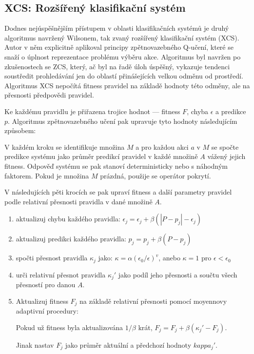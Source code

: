 \subsection{XCS: Rozšířený klasifikační systém}

Dodnes nejúspěšnějším přístupem v oblasti klasifikačních systémů je druhý algoritmus navržený Wilsonem, tak zvaný rozšířený klasifikační systém (XCS). Autor v něm explicitně aplikoval principy zpětnovazebného Q-učení, které se snaží o úplnost reprezentace problému výběru akce. Algoritmus byl navržen po zkušenostech se ZCS, který, ač byl na řadě úloh úspěšný, vykazuje tendenci soustředit prohledávání jen do oblastí přinášejících velkou odměnu od prostředí. 
Algoritmus XCS nepočítá fitness pravidel na základě hodnoty této odměny, ale na přesnosti předpovědi pravidel. 

Ke každému pravidlu je přiřazena trojice hodnot --- fitness $F$, chyba $\epsilon$ a predikce $p$. Algoritmus zpětnovazebného učení pak upravuje tyto hodnoty následujícím způsobem:  

V každém kroku se identifikuje množina $M$ a pro každou akci $a$ v $M$ se spočte predikce systému jako průměr predikcí pravidel v každé množině $A$ vážený jejich fitness. Odpověď systému se pak stanoví deterministicky nebo s náhodným faktorem. Pokud je množina $M$ prázdná, použije se operátor pokrytí.  

V následujících pěti krocích se pak upraví fitness a další parametry pravidel podle relativní přesnosti pravidla v dané množině $A$.

\begin{enumerate}
\item aktualizuj chybu každého pravidla: $\epsilon_j = \epsilon_j + \beta \left( \left| P - p_j \right| - \epsilon_j \right)$

\item aktualizuj predikci každého pravidla: $p_j = p_j + \beta (P-p_j)$

\item spočti přesnost pravidla $\kappa_j$ jako: $\kappa = \alpha (\epsilon_0/\epsilon)^v$, anebo $\kappa=1$ pro $\epsilon < \epsilon_0$

\item urči relativní přesnot pravidla $\kappa_j\prime$ jako podíl jeho přesnosti a součtu všech přesností pro danou $A$.

\item Aktualizuj fitness $F_j$ na základě relativní přesnosti pomocí moyennovy adaptivní procedury: 

Pokud už fitness byla aktualizována $1/\beta$ krát,
 $F_j = F_j + \beta(\kappa_j\prime - F_j).$ 
 
Jinak nastav $F_j$ jako průměr aktuální a předchozí hodnoty
$kappa_j\prime$.
\end{enumerate}

